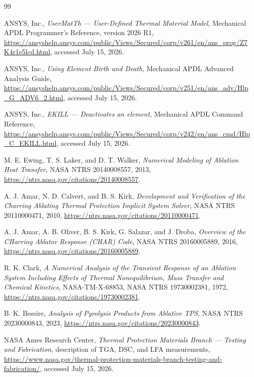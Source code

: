 \documentclass[oneside,openany]{amsdtx}
\begin{document}
\clearpage
\renewcommand{\refname}{Literatur}
\renewcommand{\bibname}{Literatur}
\begin{thebibliography}{99}

ANSYS, Inc., \emph{UserMatTh --- User-Defined Thermal Material Model},
Mechanical APDL Programmer's Reference, version 2026 R1,
\url{https://ansyshelp.ansys.com/public/Views/Secured/corp/v261/en/ans_prog/Z7K4r1e5lcd.html},
accessed July 15, 2026.

ANSYS, Inc., \emph{Using Element Birth and Death}, Mechanical APDL Advanced
Analysis Guide,
\url{https://ansyshelp.ansys.com/public/Views/Secured/corp/v251/en/ans_adv/Hlp_G_ADV6_2.html},
accessed July 15, 2026.

ANSYS, Inc., \emph{EKILL --- Deactivates an element}, Mechanical APDL Command
Reference,
\url{https://ansyshelp.ansys.com/public/Views/Secured/corp/v242/en/ans_cmd/Hlp_C_EKILL.html},
accessed July 15, 2026.

M. E. Ewing, T. S. Laker, and D. T. Walker, \emph{Numerical Modeling of
Ablation Heat Transfer}, NASA NTRS 20140008557, 2013,
\url{https://ntrs.nasa.gov/citations/20140008557}.

A. J. Amar, N. D. Calvert, and B. S. Kirk, \emph{Development and Verification of
the Charring Ablating Thermal Protection Implicit System Solver}, NASA NTRS
20110000471, 2010,
\url{https://ntrs.nasa.gov/citations/20110000471}.

A. J. Amar, A. B. Oliver, B. S. Kirk, G. Salazar, and J. Droba,
\emph{Overview of the CHarring Ablator Response (CHAR) Code}, NASA NTRS
20160005889, 2016,
\url{https://ntrs.nasa.gov/citations/20160005889}.

R. K. Clark, \emph{A Numerical Analysis of the Transient Response of an
Ablation System Including Effects of Thermal Nonequilibrium, Mass Transfer and
Chemical Kinetics}, NASA-TM-X-68853, NASA NTRS 19730002381, 1972,
\url{https://ntrs.nasa.gov/citations/19730002381}.

B. K. Bessire, \emph{Analysis of Pyrolysis Products from Ablative TPS}, NASA
NTRS 20230000843, 2023,
\url{https://ntrs.nasa.gov/citations/20230000843}.

NASA Ames Research Center, \emph{Thermal Protection Materials Branch ---
Testing and Fabrication}, description of TGA, DSC, and LFA measurements,
\url{https://www.nasa.gov/thermal-protection-materials-branch-testing-and-fabrication/},
accessed July 15, 2026.


\end{thebibliography}
\end{document}
